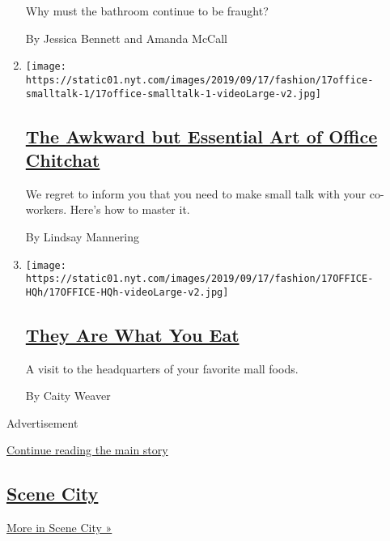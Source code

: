 \begin{enumerate}
  Why must the bathroom continue to be fraught?

  By Jessica Bennett and Amanda McCall
\item
  \texttt{[image: https://static01.nyt.com/images/2019/09/17/fashion/17office-smalltalk-1/17office-smalltalk-1-videoLarge-v2.jpg]}

  \hypertarget{the-awkward-but-essential-art-of-office-chitchat}{%
  \subsection{\texorpdfstring{\href{/2019/09/17/style/the-awkward-art-of-office-small-talk.html}{The
  Awkward but Essential Art of Office
  Chitchat}}{The Awkward but Essential Art of Office Chitchat}}\label{the-awkward-but-essential-art-of-office-chitchat}}

  We regret to inform you that you need to make small talk with your
  co-workers. Here's how to master it.

  By Lindsay Mannering
\item
  \texttt{[image: https://static01.nyt.com/images/2019/09/17/fashion/17OFFICE-HQh/17OFFICE-HQh-videoLarge-v2.jpg]}

  \hypertarget{they-are-what-you-eat}{%
  \subsection{\texorpdfstring{\href{/2019/09/17/style/moes-cinnabon-focus-brands.html}{They
  Are What You
  Eat}}{They Are What You Eat}}\label{they-are-what-you-eat}}

  A visit to the headquarters of your favorite mall foods.

  By Caity Weaver
\end{enumerate}

Advertisement

\protect\hyperlink{after-mid6}{Continue reading the main story}

\hypertarget{scene-city}{%
\subsection{\texorpdfstring{\href{/column/scene-city}{Scene
City}}{Scene City}}\label{scene-city}}

\href{/column/scene-city}{More in Scene City »}

